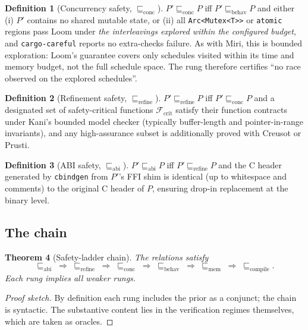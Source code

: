 \documentclass[12pt]{article}
\newtheorem{theorem}{Theorem}[section]
\theoremstyle{definition}
\newtheorem{definition}[theorem]{Definition}
\theoremstyle{remark}
\begin{document}
\begin{definition}[Concurrency safety, $\sqsubseteq_{\mathrm{conc}}$]
$P' \sqsubseteq_{\mathrm{conc}} P$ iff $P' \sqsubseteq_{\mathrm{behav}}
P$ and either (i) $P'$ contains no shared mutable state, or (ii) all
\texttt{Arc<Mutex<T>>} or \texttt{atomic} regions pass Loom under
\emph{the interleavings explored within the configured budget}, and
\texttt{cargo-careful} reports no extra-checks failure. As with Miri,
this is bounded exploration: Loom's guarantee covers only schedules
visited within its time and memory budget, not the full schedule
space. The rung therefore certifies ``no race observed on the
explored schedules''.
\end{definition}

\begin{definition}[Refinement safety, $\sqsubseteq_{\mathrm{refine}}$]
$P' \sqsubseteq_{\mathrm{refine}} P$ iff $P' \sqsubseteq_{\mathrm{conc}}
P$ and a designated set of safety-critical functions
$\mathcal{F}_{\mathrm{crit}}$ satisfy their function contracts under
Kani's bounded model checker (typically buffer-length and
pointer-in-range invariants), and any high-assurance subset is
additionally proved with Creusot or Prusti.
\end{definition}

\begin{definition}[ABI safety, $\sqsubseteq_{\mathrm{abi}}$]
$P' \sqsubseteq_{\mathrm{abi}} P$ iff $P' \sqsubseteq_{\mathrm{refine}}
P$ and the C header generated by \texttt{cbindgen} from $P'$'s FFI
shim is identical (up to whitespace and comments) to the original C
header of $P$, ensuring drop-in replacement at the binary level.
\end{definition}

\subsection{The chain}

\begin{theorem}[Safety-ladder chain]
\label{thm:chain}
The relations satisfy
\[
\sqsubseteq_{\mathrm{abi}} \;\Rightarrow\;
\sqsubseteq_{\mathrm{refine}} \;\Rightarrow\;
\sqsubseteq_{\mathrm{conc}} \;\Rightarrow\;
\sqsubseteq_{\mathrm{behav}} \;\Rightarrow\;
\sqsubseteq_{\mathrm{mem}} \;\Rightarrow\;
\sqsubseteq_{\mathrm{compile}}.
\]
Each rung implies all weaker rungs.
\end{theorem}

\begin{proof}[Proof sketch]
By definition each rung includes the prior as a conjunct; the chain is
syntactic. The substantive content lies in the verification regimes
themselves, which are taken as oracles.
\end{proof}
\end{document}
